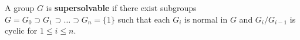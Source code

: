 A group $G$ is \textbf{supersolvable} if there exist subgroups $G = G_0 \supset G_1 \supset \dots \supset G_n = \{1\}$ such that each $G_i$ is normal in $G$ and $G_i/G_{i-1}$ is cyclic for $1 \leq i \leq n$.
